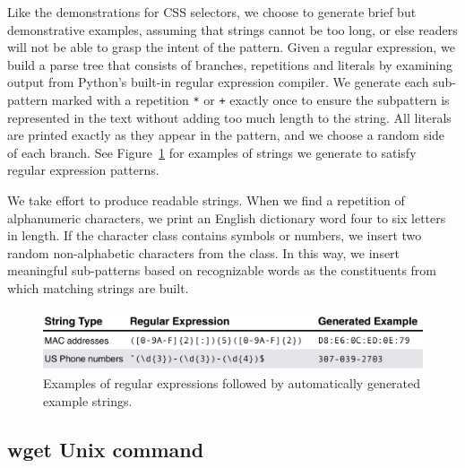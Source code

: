 Like the demonstrations for CSS selectors, we choose to generate brief but demonstrative examples, assuming that strings cannot be too long, or else readers will not be able to grasp the intent of the pattern.
Given a regular expression, we build a parse tree that consists of branches, repetitions and literals by examining output from Python's built-in regular expression compiler.
We generate each sub-pattern marked with a repetition \texttt{*} or \texttt{+} exactly once to ensure the subpattern is represented in the text without adding too much length to the string.
All literals are printed exactly as they appear in the pattern, and we choose a random side of each branch.
See Figure~\ref{fig:regex_strings} for examples of strings we generate to satisfy regular expression patterns.

We take effort to produce readable strings.
When we find a repetition of alphanumeric characters, we print an English dictionary word four to six letters in length.
If the character class contains symbols or numbers, we insert two random non-alphabetic characters from the class.
In this way, we insert meaningful sub-patterns based on recognizable words as the constituents from which matching strings are built.
\fi

\begin{figure}
\centering
\includegraphics[width=\columnwidth]{figures/regex-example-table}
\caption{Examples of regular expressions followed by automatically generated example strings.}
\label{fig:regex_strings}
\end{figure}

\subsection{wget Unix command}


